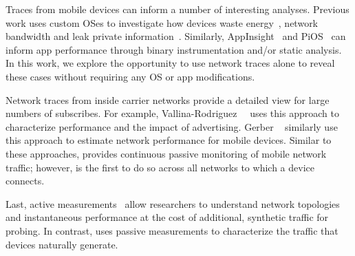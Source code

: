 Traces from mobile devices can inform a number of interesting analyses. Previous work 
uses custom OSes to investigate how devices waste energy~\cite{pathak:eprof}, network bandwidth and 
leak private information~\cite{enck:taintdroid,hornyack:appfence}. Similarly, AppInsight~\cite{ravindranath:appinsight} and PiOS~\cite{egele:pios} can inform 
app performance through binary instrumentation and/or static analysis. In this work, we explore the opportunity to use network traces 
alone to reveal these cases without requiring any OS or app modifications.

Network traces from inside carrier networks provide a detailed view for large numbers 
of subscribes. For example, Vallina-Rodriguez~\etal~\cite{vallina-rod:ads} uses this approach to characterize performance and 
the impact of advertising. Gerber \etal~\cite{gerber:passivespeed} similarly use this approach to 
estimate network performance for mobile devices.  \cite{maier:mobtraffic} \cite{chen:wifi}
Similar to these approaches, \platname provides continuous passive monitoring of mobile network 
traffic; however, \platname is the first to do so across all networks to which a device connects.

Last, active measurements~\cite{wang:middleboxes,sommers:cellwifi} allow researchers to understand network topologies and instantaneous 
performance at the cost of additional, synthetic traffic for probing. In contrast, \platname uses 
passive measurements to characterize the traffic that devices
naturally generate.

